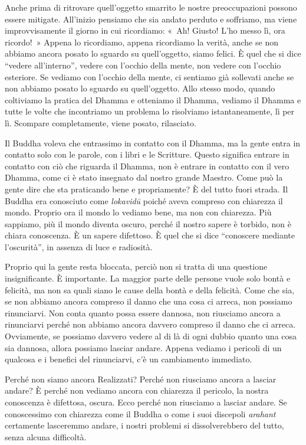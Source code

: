 Anche prima di ritrovare quell'oggetto smarrito le nostre preoccupazioni
possono essere mitigate. All'inizio pensiamo che sia andato perduto e
soffriamo, ma viene improvvisamente il giorno in cui ricordiamo: «~Ah!
Giusto! L'ho messo lì, ora ricordo!~» Appena lo ricordiamo, appena
ricordiamo la verità, anche se non abbiamo ancora posato lo sguardo su
quell'oggetto, siamo felici. È quel che si dice ``vedere all'interno'',
vedere con l'occhio della mente, non vedere con l'occhio esteriore. Se
vediamo con l'occhio della mente, ci sentiamo già sollevati anche se non
abbiamo posato lo sguardo su quell'oggetto. Allo stesso modo, quando
coltiviamo la pratica del Dhamma e otteniamo il Dhamma, vediamo il
Dhamma e tutte le volte che incontriamo un problema lo risolviamo
istantaneamente, lì per lì. Scompare completamente, viene posato,
rilasciato.

Il Buddha voleva che entrassimo in contatto con il Dhamma, ma la gente
entra in contatto solo con le parole, con i libri e le Scritture. Questo
significa entrare in contatto con ciò che riguarda il Dhamma, non è
entrare in contatto con il vero Dhamma, come ci è stato insegnato dal
nostro grande Maestro. Come può la gente dire che sta praticando bene e
propriamente? È del tutto fuori strada. Il Buddha era conosciuto come
\emph{lokavidū} poiché aveva compreso con chiarezza il mondo. Proprio
ora il mondo lo vediamo bene, ma non con chiarezza. Più sappiamo, più il
mondo diventa oscuro, perché il nostro sapere è torbido, non è chiara
conoscenza. È un sapere difettoso. È quel che si dice ``conoscere
mediante l'oscurità'', in assenza di luce e radiosità.

Proprio qui la gente resta bloccata, perciò non si tratta di una
questione insignificante. È importante. La maggior parte delle persone
vuole solo bontà e felicità, ma non sa quali siano le cause della bontà
e della felicità. Come che sia, se non abbiamo ancora compreso il danno
che una cosa ci arreca, non possiamo rinunciarvi. Non conta quanto possa
essere dannosa, non riusciamo ancora a rinunciarvi perché non abbiamo
ancora davvero compreso il danno che ci arreca. Ovviamente, se possiamo
davvero vedere al di là di ogni dubbio quanto una cosa sia dannosa,
allora possiamo lasciar andare. Appena vediamo i pericoli di un qualcosa
e i benefici del rinunciarvi, c'è un cambiamento immediato.

Perché non siamo ancora Realizzati? Perché non riusciamo ancora a
lasciar andare? È perché non vediamo ancora con chiarezza il pericolo,
la nostra conoscenza è difettosa, oscura. Ecco perché non riusciamo a
lasciar andare. Se conoscessimo con chiarezza come il Buddha o come i
suoi discepoli \emph{arahant} certamente lasceremmo andare, i nostri
problemi si dissolverebbero del tutto, senza alcuna difficoltà.


